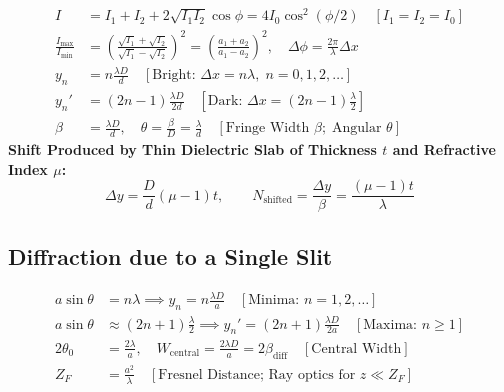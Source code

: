 \documentclass[10pt,twoside,openright]{book}
\begin{document}
\begin{formulabox}
\begin{align}
  I &= I_1 + I_2 + 2\sqrt{I_1 I_2}\cos\phi = 4I_0 \cos^2(\phi/2) \quad [I_1=I_2=I_0] \\
  \frac{I_{\max}}{I_{\min}} &= \left(\frac{\sqrt{I_1} + \sqrt{I_2}}{\sqrt{I_1} - \sqrt{I_2}}\right)^2 = \left(\frac{a_1 + a_2}{a_1 - a_2}\right)^2, \quad \Delta\phi = \frac{2\pi}{\lambda}\Delta x \\
  y_n &= n\frac{\lambda D}{d} \quad [\text{Bright: } \Delta x = n\lambda,\; n = 0, 1, 2, \dots] \\
  y_n' &= (2n - 1)\frac{\lambda D}{2d} \quad [\text{Dark: } \Delta x = (2n-1)\tfrac{\lambda}{2}] \\
  \beta &= \frac{\lambda D}{d}, \quad \theta = \frac{\beta}{D} = \frac{\lambda}{d} \quad [\text{Fringe Width } \beta;\; \text{Angular } \theta]
\end{align}
\textbf{Shift Produced by Thin Dielectric Slab of Thickness $t$ and Refractive Index $\mu$:}
\begin{equation}
  \Delta y = \frac{D}{d}(\mu - 1)t, \qquad N_{\text{shifted}} = \frac{\Delta y}{\beta} = \frac{(\mu - 1)t}{\lambda}
\end{equation}
\end{formulabox}

\subsection{Diffraction due to a Single Slit}

\begin{formulabox}
\begin{align}
  a\sin\theta &= n\lambda \implies y_n = n\frac{\lambda D}{a} \quad [\text{Minima: } n = 1, 2, \dots] \\
  a\sin\theta &\approx (2n + 1)\frac{\lambda}{2} \implies y_n' = (2n + 1)\frac{\lambda D}{2a} \quad [\text{Maxima: } n \ge 1] \\
  2\theta_0 &= \frac{2\lambda}{a}, \quad W_{\text{central}} = \frac{2\lambda D}{a} = 2\beta_{\text{diff}} \quad [\text{Central Width}] \\
  Z_F &= \frac{a^2}{\lambda} \quad [\text{Fresnel Distance; Ray optics for } z \ll Z_F]
\end{align}
\end{formulabox}
\end{document}

